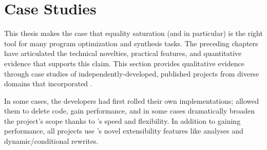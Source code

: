 \chapter{Case Studies}
\label{sec:case-studies}

This thesis makes the case that equality saturation
 (and \egg in particular)
 is the right tool for
 many program optimization and synthesis tasks.
The preceding chapters have articulated the
 technical novelties, practical features,
 and quantitative evidence that supports this claim.
This section provides qualitative evidence through case studies
 of independently-developed, published\footnotemark{}
 projects from diverse domains
 that incorporated \egg.

In some cases, the developers had first rolled their own \egraph
 implementations;
 \egg allowed them to delete code, gain performance, and in some cases
 dramatically broaden the project's scope thanks to \egg's speed and
 flexibility.
In addition to gaining performance, all projects use \egg's novel
  extensibility features like \eclass analyses and dynamic/conditional rewrites.


 
 
 

